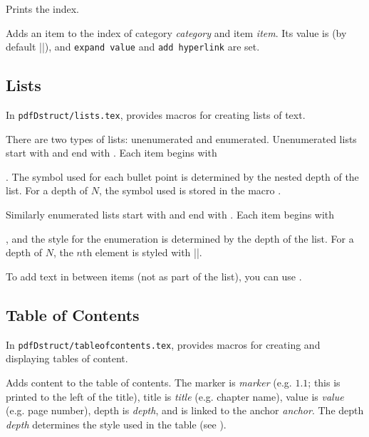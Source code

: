 \macroexp{\index}
Prints the index.
\emacroexp

Adds an item to the index of category {\it category} and item {\it item}.
Its value is \macro\@defaultindexval{} (by default \inlinecode|\the\pageno|), and {\tt expand value} and {\tt add hyperlink} are set.
\emacroexp

\subsection{Lists}

In {\tt pdfDstruct/lists.tex}, \pdftoolbox{} provides macros for creating lists of text.

There are two types of lists: unenumerated and enumerated.
Unenumerated lists start with \macro\blist\anchormacro\blist{} and end with \macro\elist\anchormacro\elist.
Each item begins with \macro\item\anchormacro\item.
The symbol used for each bullet point is determined by the nested depth of the list.
For a depth of $N$, the symbol used is stored in the macro \macro\liststyleN\anchormacro\liststyle.

Similarly enumerated lists start with \macro\benum\anchormacro\benum{} and end with \macro\elist\anchormacro\eenum.
Each item begins with \macro\item, and the style for the enumeration is determined by the depth of the list.
For a depth of $N$, the $n$th element is styled with \inlinecode||.

To add text in between items (not as part of the list), you can use \macro\mtext\anchormacro\mtext.

\subsection{Table of Contents}

In {\tt pdfDstruct/tableofcontents.tex}, \pdftoolbox{} provides macros for creating and displaying tables of content.

Adds content to the table of contents.
The marker is {\it marker} (e.g. $1.1$; this is printed to the left of the title), title is {\it title} (e.g. chapter name), value is {\it value} (e.g. page number), depth is {\it depth},
and is linked to the anchor {\it anchor}.
The depth {\it depth} determines the style used in the table (see \gotomacro\settocdepthformat).
\emacroexp

